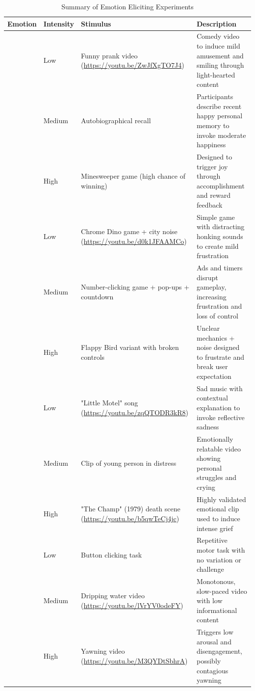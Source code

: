 \begin{table}[h]
    \centering
    \caption{Summary of Emotion Eliciting Experiments}
    \label{tab:emotion_experiments}
    \begin{tabular}{|>{\raggedright\arraybackslash}p{2.5cm}|>{\raggedright\arraybackslash}p{2.5cm}|>{\raggedright\arraybackslash}p{4cm}|>{\raggedright\arraybackslash}p{5.5cm}|}
    \hline
    \textbf{Emotion} & \textbf{Intensity} & \textbf{Stimulus} & \textbf{Description} \\
    \hline
    \multirow{3}{*}{Happiness} 
    & Low & Funny prank video (\url{https://youtu.be/ZwJfXgTO7J4}) & Comedy video to induce mild amusement and smiling through light-hearted content \\
    \cline{2-4}
    & Medium & Autobiographical recall & Participants describe recent happy personal memory to invoke moderate happiness \\
    \cline{2-4}
    & High & Minesweeper game (high chance of winning) & Designed to trigger joy through accomplishment and reward feedback \\
    \hline
    
    \multirow{3}{*}{Anger} 
    & Low & Chrome Dino game + city noise (\url{https://youtu.be/d0k1JFAAMCo}) & Simple game with distracting honking sounds to create mild frustration \\
    \cline{2-4}
    & Medium & Number-clicking game + pop-ups + countdown & Ads and timers disrupt gameplay, increasing frustration and loss of control \\
    \cline{2-4}
    & High & Flappy Bird variant with broken controls & Unclear mechanics + noise designed to frustrate and break user expectation \\
    \hline
    
    \multirow{3}{*}{Sadness} 
    & Low & "Little Motel" song (\url{https://youtu.be/zqQTODR3kR8}) & Sad music with contextual explanation to invoke reflective sadness \\
    \cline{2-4}
    & Medium & Clip of young person in distress & Emotionally relatable video showing personal struggles and crying \\
    \cline{2-4}
    & High & "The Champ" (1979) death scene (\url{https://youtu.be/b5qwTeCj4jc}) & Highly validated emotional clip used to induce intense grief \\
    \hline
    
    \multirow{3}{*}{Boredom} 
    & Low & Button clicking task & Repetitive motor task with no variation or challenge \\
    \cline{2-4}
    & Medium & Dripping water video (\url{https://youtu.be/lVrYV0odeFY}) & Monotonous, slow-paced video with low informational content \\
    \cline{2-4}
    & High & Yawning video (\url{https://youtu.be/M3QYDtSbhrA}) & Triggers low arousal and disengagement, possibly contagious yawning \\
    \hline
    

\end{tabular}
\end{table}
